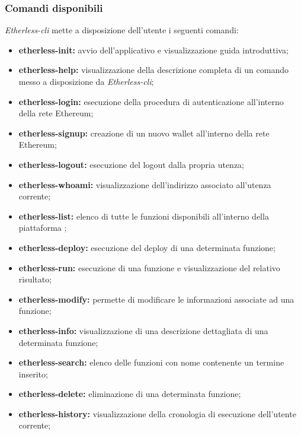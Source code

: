 \subsubsection{Comandi disponibili}
\textit{Etherless-cli} mette a disposizione dell'utente i seguenti comandi: 
\begin{itemize}
	\item \textbf{etherless-init:} avvio dell'applicativo e visualizzazione guida introduttiva; 
	\item \textbf{etherless-help:} visualizzazione della descrizione completa di un comando messo a disposizione da \textit{Etherless-cli}; 
	\item \textbf{etherless-login:} esecuzione della procedura di autenticazione all'interno della rete Ethereum; 
	\item \textbf{etherless-signup:} creazione di un nuovo wallet all'interno della rete Ethereum; 
	\item \textbf{etherless-logout:} esecuzione del logout dalla propria utenza; 
	\item \textbf{etherless-whoami:} visualizzazione dell'indirizzo associato all'utenza corrente; 
	\item \textbf{etherless-list:} elenco di tutte le funzioni disponibili all'interno della piattaforma \NomeProgetto{}; 
	\item \textbf{etherless-deploy:} esecuzione del deploy di una determinata funzione;  
	\item \textbf{etherless-run:} esecuzione di una funzione e visualizzazione del relativo risultato; 
	\item \textbf{etherless-modify:} permette di modificare le informazioni associate ad una funzione; 
	\item \textbf{etherless-info:} visualizzazione di una descrizione dettagliata di una determinata funzione; 
	\item \textbf{etherless-search:} elenco delle funzioni con nome contenente un termine inserito; 
	\item \textbf{etherless-delete:} eliminazione di una determinata funzione;
	\item \textbf{etherless-history:} visualizzazione della cronologia di esecuzione dell'utente corrente;  
\end{itemize}


